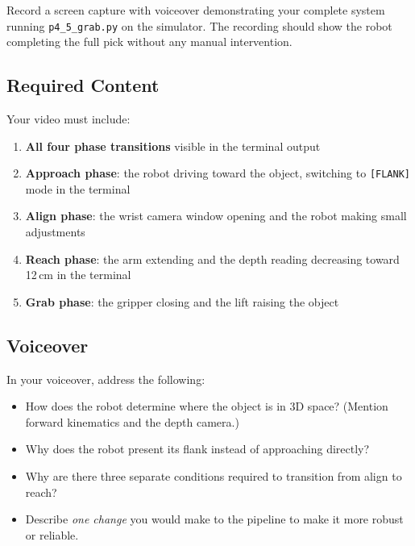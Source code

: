 \documentclass[11pt,a4paper]{article}
\begin{document}
Record a screen capture with voiceover demonstrating your complete system running \texttt{p4\_5\_grab.py} on the simulator. The recording should show the robot completing the full pick without any manual intervention.

\subsection*{Required Content}

Your video must include:

\begin{enumerate}
    \item \textbf{All four phase transitions} visible in the terminal output
    \item \textbf{Approach phase}: the robot driving toward the object, switching to \texttt{[FLANK]} mode in the terminal
    \item \textbf{Align phase}: the wrist camera window opening and the robot making small adjustments
    \item \textbf{Reach phase}: the arm extending and the depth reading decreasing toward 12\,cm in the terminal
    \item \textbf{Grab phase}: the gripper closing and the lift raising the object
\end{enumerate}

\subsection*{Voiceover}

In your voiceover, address the following:

\begin{itemize}
    \item How does the robot determine where the object is in 3D space? (Mention forward kinematics and the depth camera.)
    \item Why does the robot present its flank instead of approaching directly?
    \item Why are there three separate conditions required to transition from align to reach?
    \item Describe \emph{one change} you would make to the pipeline to make it more robust or reliable.
\end{itemize}
\end{document}
